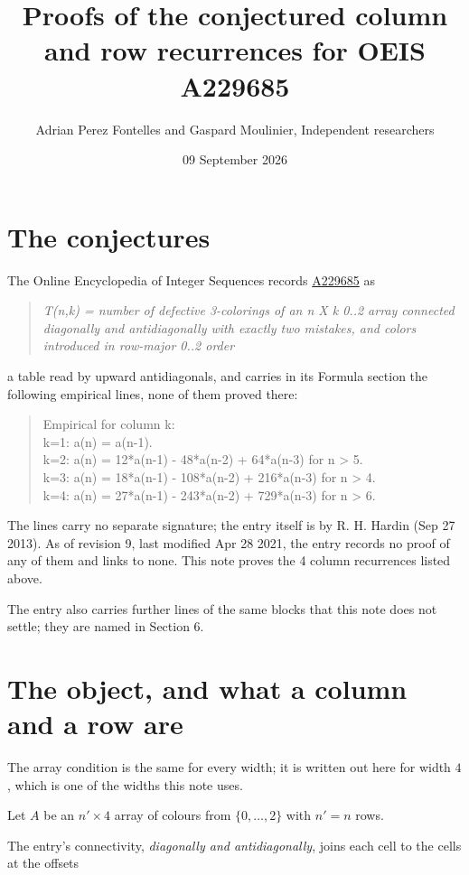 \documentclass[11pt]{article}
\title{Proofs of the conjectured column and row recurrences for OEIS A229685}
\author{Adrian Perez Fontelles and Gaspard Moulinier, Independent researchers}
\date{09 September 2026}
\theoremstyle{definition}
\begin{document}
\maketitle
\section{The conjectures}

The Online Encyclopedia of Integer Sequences records \href{https://oeis.org/A229685}{A229685} as

\begin{quote}\itshape T(n,k) = number of defective 3-colorings of an n X k 0..2 array connected diagonally and antidiagonally with exactly two mistakes, and colors introduced in row-major 0..2 order\end{quote}

a table read by upward antidiagonals, and carries in its Formula section the following empirical lines, none of them proved there:

\begin{quote}\ttfamily Empirical for column k:\\
k=1: a(n) = a(n-1).\\k=2: a(n) = 12*a(n-1) - 48*a(n-2) + 64*a(n-3) for n > 5.\\k=3: a(n) = 18*a(n-1) - 108*a(n-2) + 216*a(n-3) for n > 4.\\k=4: a(n) = 27*a(n-1) - 243*a(n-2) + 729*a(n-3) for n > 6.\end{quote}

The lines carry no separate signature; the entry itself is by R. H. Hardin (Sep 27 2013). As of revision 9, last modified Apr 28 2021, the entry records no proof of any of them and links to none. This note proves the 4 column recurrences listed above.

The entry also carries further lines of the same blocks that this note does not settle; they are named in Section 6.

\section{The object, and what a column and a row are}

The array condition is the same for every width; it is written out here for width $4$, which is one of the widths this note uses.

Let $A$ be an $n' \times 4$ array of colours from $\{0,\dots,2\}$ with $n' = n$ rows.

The entry's connectivity, {\itshape diagonally and antidiagonally}, joins each cell to the cells at the offsets
\end{document}
